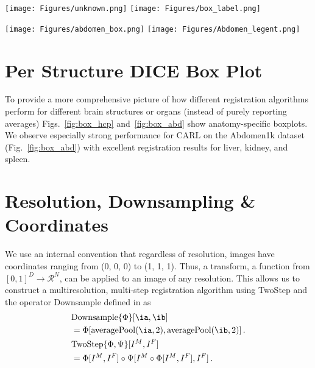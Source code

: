 


\begin{figure*}[tp!]
    \centering
    \texttt{[image: Figures/unknown.png]}
    \texttt{[image: Figures/box\_label.png]}
    \caption{Per structure DICE scores on the HCP dataset. CARL ranks well on most structures.}
    \label{fig:box_hcp}
\end{figure*}
\begin{figure*}[tp!]
    \centering
    \texttt{[image: Figures/abdomen\_box.png]}
    \texttt{[image: Figures/Abdomen\_legent.png]}
    \caption{Per structure DICE scores on the Abdomen1k dataset. We observe that CARL is dramatically ahead of competing methods on liver, kidney, and spleen registration, but performs meaninfully worse than Voxelmorph on the pancreas.}
    \label{fig:box_abd}
\end{figure*}

\section{Per Structure DICE Box Plot}
To provide a more comprehensive picture of how different registration algorithms perform for different brain structures or organs (instead of purely reporting averages) Figs.~\ref{fig:box_hcp} and~\ref{fig:box_abd} show anatomy-specific boxplots. We observe especially strong performance for CARL on the Abdomen1k dataset (Fig.~\ref{fig:box_abd}) with excellent registration results for liver, kidney, and spleen. 

\section{Resolution, Downsampling \& Coordinates}
\label{downsample}

We use an internal convention that regardless of resolution, images have coordinates ranging from (0, 0, 0) to (1, 1, 1). Thus, a transform, a function from $[0, 1]^D \rightarrow \mathcal{R}^N$, can be applied to an image of any resolution. This allows us to construct a multiresolution, multi-step registration algorithm using TwoStep and the operator Downsample defined in \cite{greer2021icon} as
\begin{align}
&\text{Downsample}\{\Phi\}[\ia, \ib] \nonumber \\
&= \Phi[ \text{averagePool}(\ia, 2), \text{averagePool}(\ib, 2)]\,. \\
&\text{TwoStep}\{\Phi, \Psi\}[I^M, I^F] \nonumber \\ &= \Phi[I^M, I^F] \circ \Psi[I^M \circ \Phi[I^M, I^F], I^F]\,.\end{align}


